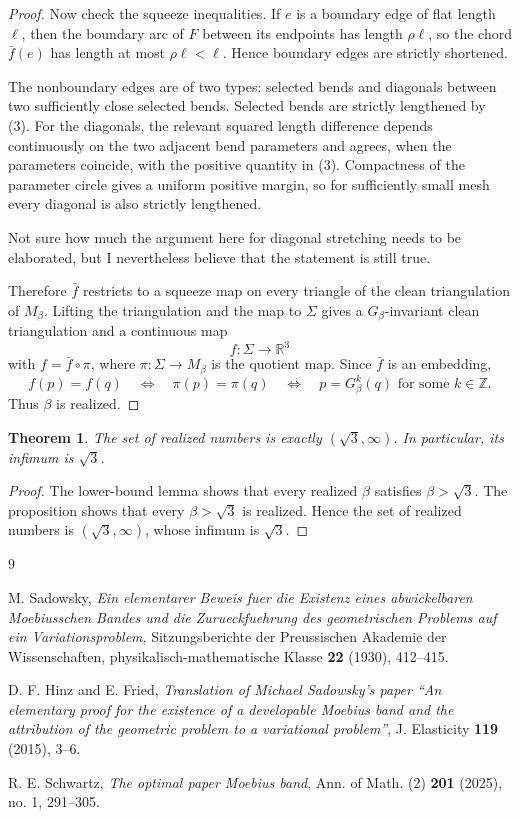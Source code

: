 \documentclass[12pt]{article}
\newtheorem{theorem}{Theorem}
\newcommand{\R}{\mathbb R}
\newcommand{\Z}{\mathbb Z}
\newcommand{\review}[1]{\begin{reviewbox}#1\end{reviewbox}}
\begin{document}
\begin{proof}
Now check the squeeze inequalities.  If \(e\) is a boundary edge of flat length \(\ell\), then the boundary arc of \(F\) between its endpoints has length \(\rho\ell\), so the chord \(\bar f(e)\) has length at most \(\rho\ell<\ell\).  Hence boundary edges are strictly shortened.

The nonboundary edges are of two types: selected bends and diagonals between two sufficiently close selected bends.  Selected bends are strictly lengthened by (3).  For the diagonals, the relevant squared length difference depends continuously on the two adjacent bend parameters and agrees, when the parameters coincide, with the positive quantity in (3).  Compactness of the parameter circle gives a uniform positive margin, so for sufficiently small mesh every diagonal is also strictly lengthened.

\review{Not sure how much the argument here for diagonal stretching needs to be elaborated, but I nevertheless believe that the statement is still true.}

Therefore \(\bar f\) restricts to a squeeze map on every triangle of the clean triangulation of \(M_\beta\).  Lifting the triangulation and the map to \(\Sigma\) gives a \(G_\beta\)-invariant clean triangulation and a continuous map
\[
f:\Sigma\to\R^3
\]
with \(f=\bar f\circ \pi\), where \(\pi:\Sigma\to M_\beta\) is the quotient map.  Since \(\bar f\) is an embedding,
\[
f(p)=f(q)\quad\Longleftrightarrow\quad \pi(p)=\pi(q)
\quad\Longleftrightarrow\quad p=G_\beta^k(q)\text{ for some }k\in\Z.
\]
Thus \(\beta\) is realized.
\end{proof}

\begin{theorem}
The set of realized numbers is exactly \((\sqrt3,\infty)\).  In particular, its infimum is \(\sqrt3\).
\end{theorem}

\begin{proof}
The lower-bound lemma shows that every realized \(\beta\) satisfies \(\beta>\sqrt3\).  The proposition shows that every \(\beta>\sqrt3\) is realized.  Hence the set of realized numbers is \((\sqrt3,\infty)\), whose infimum is \(\sqrt3\).
\end{proof}

\begin{thebibliography}{9}

M. Sadowsky,
\emph{Ein elementarer Beweis fuer die Existenz eines abwickelbaren Moebiusschen Bandes und die Zurueckfuehrung des geometrischen Problems auf ein Variationsproblem},
Sitzungsberichte der Preussischen Akademie der Wissenschaften, physikalisch-mathematische Klasse \textbf{22} (1930), 412--415.

D. F. Hinz and E. Fried,
\emph{Translation of Michael Sadowsky's paper ``An elementary proof for the existence of a developable Moebius band and the attribution of the geometric problem to a variational problem''},
J. Elasticity \textbf{119} (2015), 3--6.

R. E. Schwartz,
\emph{The optimal paper Moebius band},
Ann. of Math. (2) \textbf{201} (2025), no. 1, 291--305.

\end{thebibliography}
\end{document}
